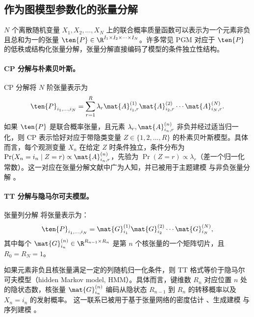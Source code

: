\subsection{作为图模型参数化的张量分解}

$N$ 个离散随机变量 $X_1,X_2,\dots, X_N$ 上的联合概率质量函数可以表示为一个元素非负且总和为一的张量 $\ten{P} \in \R^{I_1 \times I_2\times \dots \times I_N}$。许多常见 PGM 对应于 $\ten{P}$ 的低秩或结构化张量分解，张量分解直接编码了模型的条件独立性结构。

\paragraph{CP 分解与朴素贝叶斯。}
CP 分解将 $N$ 阶张量表示为
\begin{equation}
\ten{P}_{i_1,\dots,i_N} = \sum_{r=1}^{R} \lambda_r \mat{A}^{(1)}_{i_1,r} \mat{A}^{(2)}_{i_2,r} \cdots \mat{A}^{(N)}_{i_N,r}.
\end{equation}
如果 $\ten{P}$ 是联合概率张量，且元素 $\lambda_r, \mat{A}^{(n)}_{i_n,r}$ 非负并经过适当归一化，则 CP 表示恰好对应于带隐类变量 $Z \in \{1,2,\dots,R\}$ 的朴素贝叶斯模型。具体而言，每个观测变量 $X_n$ 在给定 $Z$ 时条件独立，条件分布为 $\Pr(X_n = i_n \mid Z = r) \propto \mat{A}^{(n)}_{i_n,r}$，先验为 $\Pr(Z = r) \propto \lambda_r$（差一个归一化常数）。这一对应在张量分解文献中广为人知，并已被用于主题建模 \cite{anandkumar2014tensor} 与非负张量分解 \cite{cichocki2009nonnegative}。


\paragraph{TT 分解与隐马尔可夫模型。}
张量列分解 \cite{oseledets2011tensor} 将张量表示为：
\begin{equation}
\ten{P}_{i_1,\dots,i_N} = \mat{G}^{(1)}_{i_1} \mat{G}^{(2)}_{i_2} \cdots \mat{G}^{(N)}_{i_N},
\end{equation}
其中每个 $\mat{G}^{(n)}_{i_n} \in \R^{R_{n-1} \times R_n}$ 是第 $n$ 个核张量的一个矩阵切片，且 $R_0 = R_N = 1$。

如果元素非负且核张量满足一定的列随机归一化条件，则 TT 格式等价于隐马尔可夫模型（hidden Markov model, HMM）\cite{glasser2019expressive}。具体而言，键维数 $R_n$ 对应位置 $n$ 处的隐状态数，核张量 $\mat{G}^{(n)}_{i_n}$ 编码从隐状态 $R_{n-1}$ 到 $R_n$ 的转移概率以及 $X_n = i_n$ 的发射概率。
这一联系已被用于基于张量网络的密度估计 \cite{han2018unsupervised}、生成建模 \cite{glasser2020probabilistic} 与序列建模 \cite{stoudenmire2016supervised}。

